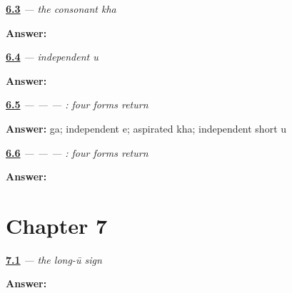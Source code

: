 \noindent\begin{minipage}[t]{\linewidth}
\raggedright
\hyperlink{review-GU-W06-kha-recall}{\textbf{6.3}} \emph{ — the consonant kha}\par
\small \textbf{Answer:} \par
\end{minipage}\par\medskip

\noindent\begin{minipage}[t]{\linewidth}
\raggedright
\hyperlink{review-GU-W06-independent-u-recall}{\textbf{6.4}} \emph{ — independent u}\par
\small \textbf{Answer:} \par
\end{minipage}\par\medskip

\noindent\begin{minipage}[t]{\linewidth}
\raggedright
\hyperlink{review-GU-R06-first-four-r1-reading}{\textbf{6.5}} \emph{ —  —  — : four forms return}\par
\small \textbf{Answer:} ga; independent e; aspirated kha; independent short u\par
\end{minipage}\par\medskip

\noindent\begin{minipage}[t]{\linewidth}
\raggedright
\hyperlink{review-GU-R06-first-four-r1-dictation}{\textbf{6.6}} \emph{ —  —  — : four forms return}\par
\small \textbf{Answer:}    \par
\end{minipage}\par\medskip

\section*{Chapter 7}

\noindent\begin{minipage}[t]{\linewidth}
\raggedright
\hyperlink{review-GU-W07-uu-matra-recall}{\textbf{7.1}} \emph{ — the long-ū sign}\par
\small \textbf{Answer:} \par
\end{minipage}\par\medskip

